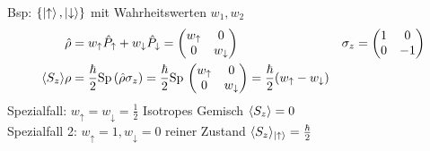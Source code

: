 	Bsp: $\{\ket{\uparrow}, \ket{\downarrow} \}$ mit Wahrheitswerten $w_1, w_2$ 
		\begin{align*}
			\hat{\rho} &= w_\uparrow \hat{P}_\uparrow + w_\downarrow \hat{P}_\downarrow =
			\begin{pmatrix}
				w_\uparrow & 0 \\
				0 & w_\downarrow 
			\end{pmatrix}&
			\sigma_z &= 
			\begin{pmatrix}
				1 & 0 \\
				0 & -1
			\end{pmatrix} \\
			\langle {S_z} \rangle \rho &= 
			\frac{\hbar}{2} \mathrm{Sp}\, (\hat{\rho} \sigma_z) =
			\frac{\hbar}{2} \mathrm{Sp}\, 
			\begin{pmatrix}
			w_\uparrow & 0 \\
			0 & w_\downarrow 
			\end{pmatrix} =
			\frac{\hbar}{2} (w_\uparrow - w_\downarrow) 
		\end{align*}
	Spezialfall: $w_\uparrow = w_\downarrow = \frac{1}{2}$ Isotropes Gemisch $\langle {S_z} \rangle = 0$
	\\
	Spezialfall 2: $w_\uparrow = 1, w_\downarrow = 0$ reiner Zustand $\langle {S_z} \rangle_{\ket{\uparrow}} = \frac{\hbar}{2}$